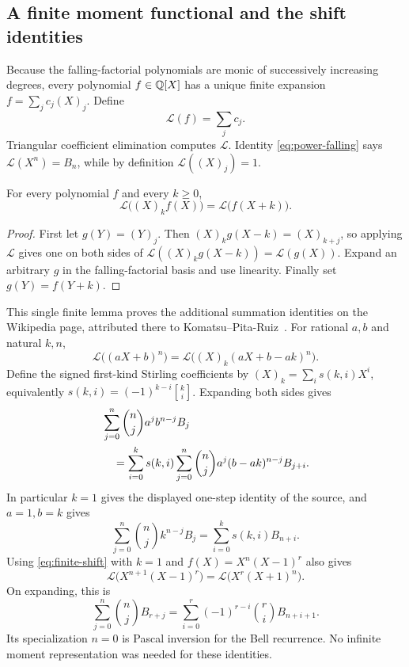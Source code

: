 \subsection{A finite moment functional and the shift identities}
\label{subsec:finite-functional}

Because the falling-factorial polynomials are monic of successively increasing
degrees, every polynomial $f\in\mathbb Q[X]$ has a unique finite expansion
$f=\sum_jc_j(X)_j$. Define
\[
 \mathcal L(f)=\sum_jc_j.
\]
Triangular coefficient elimination computes $\mathcal L$. Identity
\eqref{eq:power-falling} says $\mathcal L(X^n)=B_n$, while by definition
$\mathcal L((X)_j)=1$.

\begin{lemma}\label{lem:finite-shift}
For every polynomial $f$ and every $k\geq0$,
\begin{equation}\label{eq:finite-shift}
 \mathcal L\bigl((X)_k f(X)\bigr)
          =\mathcal L\bigl(f(X+k)\bigr).
\end{equation}
\end{lemma}
\begin{proof}
First let $g(Y)=(Y)_j$. Then
$(X)_k g(X-k)=(X)_{k+j}$, so applying $\mathcal L$ gives one on both sides of
$\mathcal L((X)_k g(X-k))=\mathcal L(g(X))$. Expand an arbitrary $g$ in the
falling-factorial basis and use linearity. Finally set $g(Y)=f(Y+k)$.
\end{proof}

This single finite lemma proves the additional summation identities on the
Wikipedia page, attributed there to Komatsu--Pita-Ruiz~\cite{komatsu-pita}.
For rational $a,b$ and natural $k,n$,
\begin{equation}\label{eq:general-umbral-shift}
 \mathcal L\bigl((aX+b)^n\bigr)
 =\mathcal L\bigl((X)_k(aX+b-ak)^n\bigr).
\end{equation}
Define the signed first-kind Stirling coefficients by
$(X)_k=\sum_i s(k,i)X^i$, equivalently
$s(k,i)=(-1)^{k-i}\genfrac{[}{]}{0pt}{}{k}{i}$. Expanding both sides gives
\begin{align}\label{eq:general-stirling-shift}
 &\sum_{j=0}^{n}\binom nj a^j b^{n-j}B_j\notag\\
 &\quad=\sum_{i=0}^{k}s(k,i)
       \sum_{j=0}^{n}\binom nj a^j(b-ak)^{n-j}B_{j+i}.
\end{align}
In particular $k=1$ gives the displayed one-step identity of the source,
and $a=1,b=k$ gives
\[
 \sum_{j=0}^{n}\binom nj k^{n-j}B_j
       =\sum_{i=0}^{k}s(k,i)B_{n+i}.
\]
Using \eqref{eq:finite-shift} with $k=1$ and
$f(X)=X^n(X-1)^r$ also gives
\[
 \mathcal L\bigl(X^{n+1}(X-1)^r\bigr)
       =\mathcal L\bigl(X^r(X+1)^n\bigr).
\]
On expanding, this is
\begin{equation}\label{eq:general-pascal-inversion}
 \sum_{j=0}^{n}\binom nj B_{r+j}
   =\sum_{i=0}^{r}(-1)^{r-i}\binom ri B_{n+i+1}.
\end{equation}
Its specialization $n=0$ is Pascal inversion for the Bell recurrence.
No infinite moment representation was needed for these identities.

